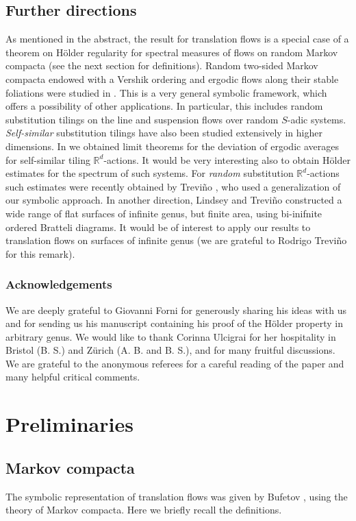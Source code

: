\documentclass[11pt]{article}
\numberwithin{equation}{section}\newcommand{\Relation}[2][]{}\newtheorem*{prop*}{Proposition}
\theoremstyle{plain}
\theoremstyle{definition}
\newcommand{\R}{\mathbb{R}}
\begin{document}
\subsection{Further directions} As mentioned in the abstract, the result for translation flows is a special case of a theorem on Hölder regularity for spectral measures of flows on random Markov compacta (see the next section for definitions).
Random two-sided Markov compacta endowed with a Vershik ordering and ergodic flows along their stable foliations were studied in \cite{Buf-umn}.
This is a very general symbolic framework, which offers a possibility of other applications. In particular, this includes random substitution tilings on the line and suspension flows over random $S$-adic systems.
\emph{Self-similar} substitution tilings have also been studied extensively in higher dimensions. In \cite{BuSol--limit} we obtained limit theorems for the deviation of ergodic averages for self-similar tiling $\R^d$-actions. It would be very interesting also to obtain Hölder estimates for the spectrum of such systems. For \emph{random} substitution $\R^d$-actions such estimates were recently obtained by
Trevi\~no \cite{Tre_prepint}, who used a generalization of our symbolic approach. In another direction,
Lindsey and Trevi\~no \cite{LinTre} constructed a wide range of flat surfaces of infinite genus, but finite area, using bi-inifnite ordered Bratteli diagrams. It would be of interest to apply our results to translation flows on surfaces of infinite genus (we are grateful to Rodrigo Trevi\~no for this remark).

\subsubsection*{Acknowledgements} We are deeply grateful to Giovanni Forni for generously sharing his ideas with us and for sending us his manuscript containing his proof of the Hölder property in arbitrary genus. We would like to thank Corinna Ulcigrai for her hospitality in Bristol (B. S.) and Zürich (A. B. and B. S.), and for many fruitful discussions. We are grateful to the anonymous referees for a careful reading of the paper and many helpful critical comments.

\section{Preliminaries}

\subsection{Markov compacta}\label{subsec:2.1}
The symbolic representation of translation flows was given by Bufetov \cite{Buf-umn}, using the theory of Markov compacta. Here we briefly recall the definitions.
\end{document}
